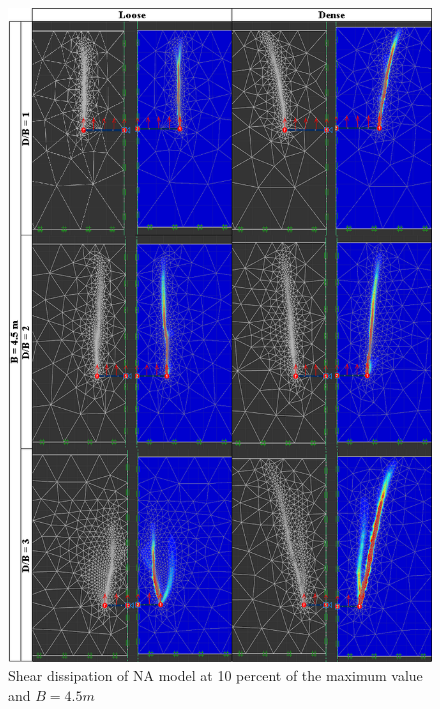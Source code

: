 \documentclass[a4paper, nobind]{templates/ociamthesis}
\begin{document}
\begin{figure}[H]
\includegraphics[width=1\linewidth]{myfigureeeeee/E_four_point_five} \caption{Shear dissipation of NA model at 10 percent of the maximum value and $B = 4.5m$}\label{fig:unnamed-chunk-29}
\end{figure}
\end{document}
